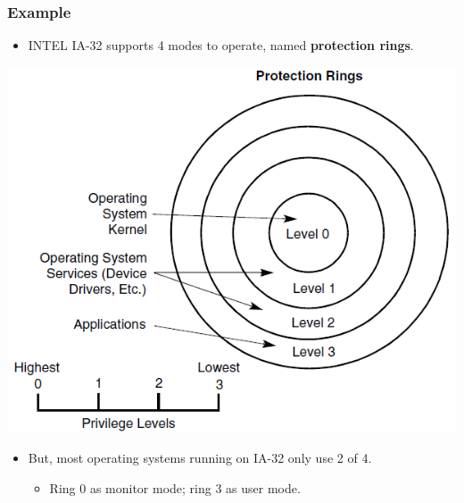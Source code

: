 \documentclass[CJKutf8,xcolor=pdftex,dvipsnames,table]{beamer}
\begin{document}
\begin{CJK*}{UTF8}{song}
  \begin{frame}
    \frametitle{Example} \pause
    \begin{itemize}
    \item{INTEL IA-32 supports 4 modes to operate, named \textbf{protection rings}.} \pause
    \end{itemize}
    \begin{center}
      \includegraphics[scale=0.3]{x86rings} \pause
    \end{center}
    \begin{itemize}
    \item{But, most operating systems running on IA-32 only use 2 of 4.} \pause
      \begin{itemize}
      \item{Ring 0 as monitor mode; \pause ring 3 as user mode.}
      \end{itemize}
    \end{itemize}
  \end{frame}


\end{CJK*}
\end{document}
